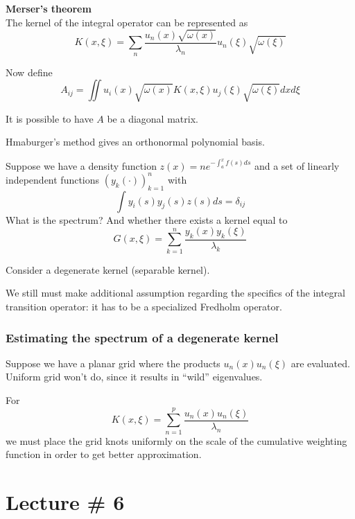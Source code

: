 \documentclass[a4paper]{article}
\newcommand{\brac}[1]{{\left ( #1 \right )}}
\begin{document}
\noindent\textbf{Merser's theorem}\hfill\\
The kernel of the integral operator can be represented as
\[K(x,\xi) = \sum_n \frac{u_n(x)\sqrt{\omega(x)} }{\lambda_n} u_n(\xi)\sqrt{\omega(\xi)} \]

Now define 
\[A_{ij} = \iint u_i(x)\sqrt{\omega(x)} K(x,\xi) u_j(\xi)\sqrt{\omega(\xi)} dxd\xi\]

It is possible to have $A$ be a diagonal matrix.

Hmaburger's method gives an orthonormal polynomial basis.

Suppose we have a density function $z(x) = ne^{-\int_a^x f(s) ds}$ and a set of linearly independent functions $\brac{y_k(\cdot)}_{k=1}^n$ with
\[\int y_i(s) y_j(s) z(s) ds = \delta_{ij}\]
What is the spectrum? And whether there exists a kernel equal to
\[G(x,\xi)=\sum_{k=1}^n \frac{y_k(x)y_k(\xi)}{\lambda_k}\]

Consider a degenerate kernel (separable kernel).

We still must make additional assumption regarding the specifics of the integral transition operator: it has to be a specialized Fredholm operator.


\subsubsection{Estimating the spectrum of a degenerate kernel} %
\label{ssub:estimating_the_spectrum_of_a_degenerate_kernel}

Suppose we have a planar grid where the products $u_n(x) u_n(\xi)$ are evaluated. Uniform grid won't do, since it results in ``wild'' eigenvalues.

For \[K(x,\xi) = \sum_{n=1}^p \frac{u_n(x) u_n(\xi)}{\lambda_n}\]
we must place the grid knots uniformly on the scale of the cumulative weighting function in order to get better approximation.






\section{Lecture \# 6} %
\label{sec:lecture_6}
\end{document}
